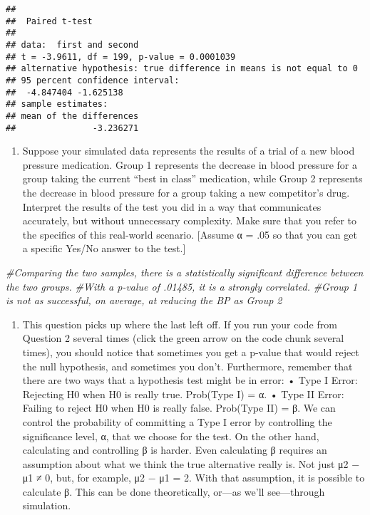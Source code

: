 \documentclass[
]{article}
\newenvironment{Shaded}{\begin{snugshade}}{\end{snugshade}}
\newcommand{\CommentTok}[1]{\textcolor[rgb]{0.56,0.35,0.01}{\textit{#1}}}
\providecommand{\tightlist}{%
  \setlength{\itemsep}{0pt}\setlength{\parskip}{0pt}}
\begin{document}
\begin{verbatim}
## 
##  Paired t-test
## 
## data:  first and second
## t = -3.9611, df = 199, p-value = 0.0001039
## alternative hypothesis: true difference in means is not equal to 0
## 95 percent confidence interval:
##  -4.847404 -1.625138
## sample estimates:
## mean of the differences 
##               -3.236271
\end{verbatim}

\begin{enumerate}
\def\labelenumi{\alph{enumi}.}
\setcounter{enumi}{1}
\tightlist
\item
  Suppose your simulated data represents the results of a trial of a new
  blood pressure medication. Group 1 represents the decrease in blood
  pressure for a group taking the current ``best in class'' medication,
  while Group 2 represents the decrease in blood pressure for a group
  taking a new competitor's drug. Interpret the results of the test you
  did in a way that communicates accurately, but without unnecessary
  complexity. Make sure that you refer to the specifics of this
  real-world scenario. {[}Assume α = .05 so that you can get a specific
  Yes/No answer to the test.{]}
\end{enumerate}

\begin{Shaded}
\begin{Highlighting}[]
\CommentTok{\#Comparing the two samples, there is a statistically significant difference between the two groups.}
\CommentTok{\#With a p{-}value of .01485, it is a strongly correlated. }
\CommentTok{\#Group 1 is not as successful, on average, at reducing the BP as Group 2}
\end{Highlighting}
\end{Shaded}

\begin{enumerate}
\def\labelenumi{\arabic{enumi}.}
\setcounter{enumi}{2}
\tightlist
\item
  This question picks up where the last left off. If you run your code
  from Question 2 several times (click the green arrow on the code chunk
  several times), you should notice that sometimes you get a p-value
  that would reject the null hypothesis, and sometimes you don't.
  Furthermore, remember that there are two ways that a hypothesis test
  might be in error: • Type I Error: Rejecting H0 when H0 is really
  true. Prob(Type I) = α. • Type II Error: Failing to reject H0 when H0
  is really false. Prob(Type II) = β. We can control the probability of
  committing a Type I error by controlling the significance level, α,
  that we choose for the test. On the other hand, calculating and
  controlling β is harder. Even calculating β requires an assumption
  about what we think the true alternative really is. Not just μ2 − μ1 ≠
  0, but, for example, μ2 − μ1 = 2. With that assumption, it is possible
  to calculate β. This can be done theoretically, or---as we'll
  see---through simulation.
\end{enumerate}
\end{document}

